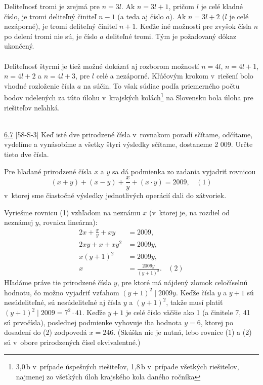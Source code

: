 Deliteľnosť tromi je zrejmá pre $n = 3l$. Ak $n = 3l + 1$, pričom $l$ je celé kladné číslo, je tromi deliteľný činiteľ $n - 1$ (a teda aj číslo $a$). Ak $n = 3l + 2$ ($l$ je celé nezáporné), je tromi deliteľný činiteľ $n + 1$. Keďže iné možnosti pre zvyšok čísla $n$ po delení tromi nie sú, je číslo $a$ deliteľné tromi. Tým je požadovaný dôkaz ukončený.\\
\\
\kom  Deliteľnosť štyrmi je tiež možné dokázať aj rozborom možností $n=4l$, $n=4l+1$, $n=4l+2$ a $n=4l+3$, pre $l$ celé a nezáporné. Kľúčovým krokom v~riešení bolo vhodné rozloženie čísla $a$ na súčin. To však súdiac podľa priemerného počtu bodov udelených za túto úlohu v~krajských kolách\footnote{3,0\,b v~prípade úspešných riešiteľov, 1,8\,b v~prípade všetkých riešiteľov, najmenej zo všetkých úloh krajského kola daného ročníka} na Slovensku bola úloha pre riešiteľov neľahká.\\
\\
\begin{tcolorbox}[breakable,notitle,boxrule=0pt,colback=light-gray,colframe=light-gray]\ul{6.7} [58-S-3]
Keď isté dve prirodzené čísla v~rovnakom poradí sčítame, odčítame, vydelíme a vynásobíme a všetky štyri výsledky sčítame, dostaneme 2 009. Určte tieto dve čísla.

\end{tcolorbox}

\rie Pre hľadané prirodzené čísla $x$ a $y$ sa dá podmienka zo zadania vyjadriť rovnicou
$$(x + y) + (x - y) +\frac{x}{y}+ (x \cdot y) = 2 009, \ \ \ \ (1)$$
v~ktorej sme čiastočné výsledky jednotlivých operácií dali do zátvoriek.

Vyriešme rovnicu (1) vzhľadom na neznámu $x$ (v~ktorej je, na rozdiel od neznámej $y$, rovnica lineárna):
\begin{align*}
2x +\frac{x}{y}+ xy &= 2 009,\\
2xy + x + xy^2 &= 2 009y,\\
x(y + 1)^2 &= 2 009y,\\
x &= \frac{2009y}{(y + 1)^2}. \ \ \ \ (2)
\end{align*}
Hľadáme práve tie prirodzené čísla $y$, pre ktoré má nájdený zlomok celočíselnú hodnotu, čo možno vyjadriť vzťahom $(y + 1)^2 \mid 2009y$. Keďže čísla $y$ a $y + 1$ sú nesúdeliteľné, sú nesúdeliteľné aj čísla $y$ a $(y +1)^2$, takže musí platiť $(y +1)^2 \mid 2009 = 7^2 \cdot41$. Keďže $y +1$ je celé číslo väčšie ako 1 (a činitele 7, 41 sú prvočísla), poslednej podmienke vyhovuje iba hodnota $y = 6$, ktorej po dosadení do (2) zodpovedá $x = 246$. (Skúška nie je nutná, lebo rovnice (1) a (2) sú v~obore prirodzených čísel ekvivalentné.)

